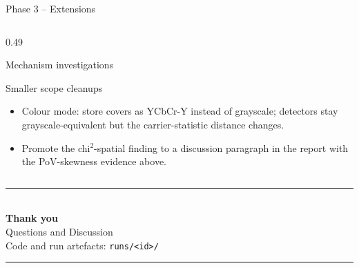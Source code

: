 \documentclass[aspectratio=169,11pt]{beamer}
\begin{document}
\begin{frame}{Phase 3 -- Extensions}
\begin{columns}[T]
\begin{column}{0.49\textwidth}
\begin{block}{Mechanism investigations}
\begin{itemize}
\end{itemize}
\end{block}
\begin{block}{Smaller scope cleanups}
\begin{itemize}\setlength{\itemsep}{1pt}
\item Colour mode: store covers as YCbCr-Y instead of grayscale; detectors stay grayscale-equivalent but the carrier-statistic distance changes.
\item Promote the chi$^2$-spatial finding to a discussion paragraph in the report with the PoV-skewness evidence above.
\end{itemize}
\end{block}
\end{column}
\end{columns}
\end{frame}

\begin{frame}[plain]
\vfill
\begin{center}
{\color{umorange}\rule{0.32\textwidth}{2pt}}\\[14pt]
{\LARGE\bfseries\color{umdark}Thank you}\\[10pt]
{\large\color{umgray}Questions and Discussion}\\[16pt]
{\small\color{umgray}Code and run artefacts: \texttt{runs/<id>/}}\\[14pt]
{\color{umorange}\rule{0.32\textwidth}{2pt}}
\end{center}
\vfill
\end{frame}
\end{document}
